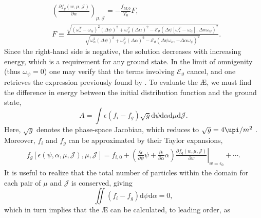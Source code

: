\begin{equation}
    \begin{aligned}
        &\left( \frac{ \partial f_g(w,\mu,\mathcal{J})}{\partial w} \right)_{\mu,\mathcal{J}} = - \frac{f_{M,0}}{T_0} F, \\
        &F \equiv \frac{\sqrt{(\omega_*^T - \omega_\alpha)^2 (\Delta \psi)^2 + \omega_\psi^2 (\Delta \alpha)^2 - \mathcal{E}_\vartheta ( \Delta \psi [\omega_*^T-\omega_\alpha], \Delta \alpha \omega_\psi )^2 }}{\sqrt{\omega_\alpha^2 (\Delta \psi)^2 + \omega_\psi^2 (\Delta \alpha)^2- \mathcal{E}_\vartheta ( \Delta \psi \omega_\alpha, -\Delta \alpha \omega_\psi )^2} }.
    \end{aligned}
\end{equation}
Since the right-hand side is negative, the solution decreases with increasing energy, which is a requirement for any ground state. In the limit of omnigenity (thus $\omega_\psi = 0$) one may verify that the terms involving $\mathcal{E}_\vartheta$ cancel, and one retrieves the expression previously found by \citet{Helander2020AvailablePlasmas}. 
To evaluate the \AE{}, we must find the difference in energy between the initial distribution function and the ground state,
\begin{equation}
    A = \int \epsilon \left( f_i - f_g \right) \sqrt{g} \mathrm{d}\psi \mathrm{d}\alpha \mathrm{d}\mu \mathrm{d}\mathcal{J}.
\end{equation}
Here, $\sqrt{g}$ denotes the phase-space Jacobian, which reduces to $\sqrt{g}= 4 \upi / m^2$ \citep{Helander2017AvailablePlasmas}. Moreover, $f_i$ and $f_g$ can be approximated by their Taylor expansions, 
\begin{equation}
    \begin{aligned}
        f_g\left[ \epsilon(\psi,\alpha,\mu,\mathcal{J}),\mu,\mathcal{J} \right] 
        = f_{i,0} +  \left( \frac{\partial \epsilon}{\partial \psi} \psi + \frac{\partial \epsilon}{\partial \alpha} \alpha \right) \left. \frac{ \partial f_g(w,\mu,\mathcal{J})}{\partial w} \right|_{w = \epsilon_0}
        + \cdots.
    \end{aligned}
\end{equation} 
It is useful to realize that the total number of particles within the domain for each pair of $\mu$ and $\mathcal{J}$ is conserved, giving
\begin{equation}
    \iint \left( f_i - f_g \right) \mathrm{d}\psi \mathrm{d}\alpha = 0,
\end{equation}
which in turn implies that the \AE{} can be calculated, to leading order, as
